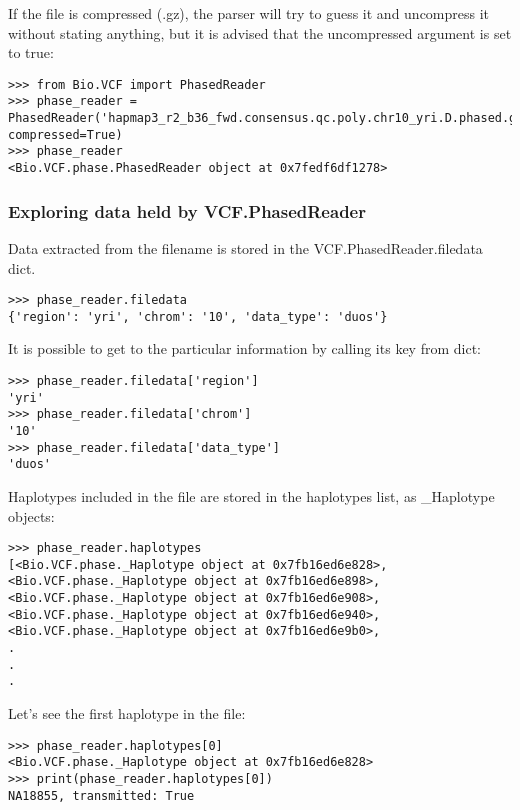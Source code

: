 \noindent If the file is compressed (.gz), the parser will try to guess it and uncompress it without stating anything, but it is advised that the uncompressed argument is set
to true:

\begin{verbatim}
>>> from Bio.VCF import PhasedReader
>>> phase_reader = PhasedReader('hapmap3_r2_b36_fwd.consensus.qc.poly.chr10_yri.D.phased.gz',
compressed=True)
>>> phase_reader
<Bio.VCF.phase.PhasedReader object at 0x7fedf6df1278>

\end{verbatim}

\subsubsection{Exploring data held by VCF.PhasedReader}

\noindent Data extracted from the filename is stored in the VCF.PhasedReader.filedata dict.

\begin{verbatim}
>>> phase_reader.filedata
{'region': 'yri', 'chrom': '10', 'data_type': 'duos'}

\end{verbatim}

\noindent It is possible to get to the particular information by calling its key from dict:

\begin{verbatim}
>>> phase_reader.filedata['region']
'yri'
>>> phase_reader.filedata['chrom']
'10'
>>> phase_reader.filedata['data_type']
'duos'

\end{verbatim}

\noindent Haplotypes included in the file are stored in the haplotypes list, as \_Haplotype objects:

\begin{verbatim}
>>> phase_reader.haplotypes
[<Bio.VCF.phase._Haplotype object at 0x7fb16ed6e828>,
<Bio.VCF.phase._Haplotype object at 0x7fb16ed6e898>,
<Bio.VCF.phase._Haplotype object at 0x7fb16ed6e908>,
<Bio.VCF.phase._Haplotype object at 0x7fb16ed6e940>,
<Bio.VCF.phase._Haplotype object at 0x7fb16ed6e9b0>,
.
.
.

\end{verbatim}

\noindent Let's see the first haplotype in the file:

\begin{verbatim}
>>> phase_reader.haplotypes[0]
<Bio.VCF.phase._Haplotype object at 0x7fb16ed6e828>
>>> print(phase_reader.haplotypes[0])
NA18855, transmitted: True

\end{verbatim}

